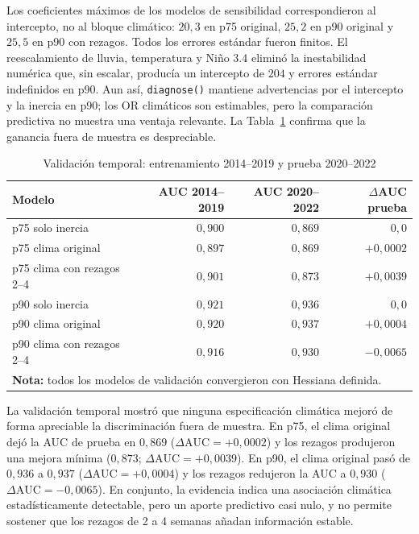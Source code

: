 \documentclass[11pt,a4paper]{article}
\begin{document}
\medskip

Los coeficientes máximos de los modelos de sensibilidad correspondieron al intercepto, no al bloque climático: $20{,}3$ en p75 original, $25{,}2$ en p90 original y $25{,}5$ en p90 con rezagos. Todos los errores estándar fueron finitos. El reescalamiento de lluvia, temperatura y Niño 3.4 eliminó la inestabilidad numérica que, sin escalar, producía un intercepto de $204$ y errores estándar indefinidos en p90. Aun así, \texttt{diagnose()} mantiene advertencias por el intercepto y la inercia en p90; los OR climáticos son estimables, pero la comparación predictiva no muestra una ventaja relevante. La Tabla~\ref{tab:validacion_temporal} confirma que la ganancia fuera de muestra es despreciable.

\begin{table}[htbp]
	\centering
	\small
	\caption{Validación temporal: entrenamiento 2014--2019 y prueba 2020--2022}
	\label{tab:validacion_temporal}
	\begin{tabular}{lrrr}
		\toprule
		\textbf{Modelo} & \textbf{AUC 2014--2019} & \textbf{AUC 2020--2022} & \textbf{$\Delta$AUC prueba} \\
		\midrule
		p75 solo inercia & $0{,}900$ & $0{,}869$ & $0{,}0$ \\
		p75 clima original & $0{,}897$ & $0{,}869$ & $+0{,}0002$ \\
		p75 clima con rezagos 2--4 & $0{,}901$ & $0{,}873$ & $+0{,}0039$ \\
		\midrule
		p90 solo inercia & $0{,}921$ & $0{,}936$ & $0{,}0$ \\
		p90 clima original & $0{,}920$ & $0{,}937$ & $+0{,}0004$ \\
		p90 clima con rezagos 2--4 & $0{,}916$ & $0{,}930$ & $-0{,}0065$ \\
		\midrule
		\multicolumn{4}{l}{\textbf{Nota:} todos los modelos de validación convergieron con Hessiana definida.} \\
		\bottomrule
	\end{tabular}
\end{table}

La validación temporal mostró que ninguna especificación climática mejoró de forma apreciable la discriminación fuera de muestra. En p75, el clima original dejó la AUC de prueba en $0{,}869$ ($\Delta\text{AUC} = +0{,}0002$) y los rezagos produjeron una mejora mínima ($0{,}873$; $\Delta\text{AUC} = +0{,}0039$). En p90, el clima original pasó de $0{,}936$ a $0{,}937$ ($\Delta\text{AUC} = +0{,}0004$) y los rezagos redujeron la AUC a $0{,}930$ ($\Delta\text{AUC} = -0{,}0065$). En conjunto, la evidencia indica una asociación climática estadísticamente detectable, pero un aporte predictivo casi nulo, y no permite sostener que los rezagos de 2 a 4 semanas añadan información estable.
\end{document}
